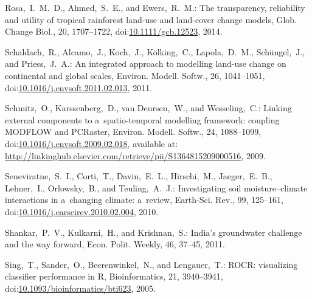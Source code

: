 \documentclass[gmdd, online, hvmath]{copernicus}
\begin{document}
\begin{thebibliography}{97}
    Rosa,~I.~M.~D., Ahmed,~S.~E., and Ewers,~R.~M.: The transparency,
    reliability and utility of tropical rainforest land-use and
    land-cover change models, Glob. Change Biol., 20, 1707--1722,
    doi:\href{http://dx.doi.org/10.1111/gcb.12523}{10.1111/gcb.12523}, 2014.


    Schaldach,~R., Alcamo,~J., Koch,~J., K\"{o}lking,~C.,
    Lapola,~D.~M., Sch\"{u}ngel,~J., and Priess,~J.~A.: An integrated
    approach to modelling land-use change on continental and global
    scales, Environ. Modell. Softw., 26, 1041--1051,
    doi:\href{http://dx.doi.org/10.1016/j.envsoft.2011.02.013}{10.1016/j.envsoft.2011.02.013}, 2011.


   Schmitz,~O., Karssenberg,~D., van
    Deursen,~W., and Wesseling,~C.: Linking external components to
    a~spatio-temporal modelling framework: coupling {MODFLOW} and
    {PCRaster}, Environ. Modell. Softw., 24, 1088--1099,
    doi:\href{http://dx.doi.org/10.1016/j.envsoft.2009.02.018}{10.1016/j.envsoft.2009.02.018}, available at:
    \url{http://linkinghub.elsevier.com/retrieve/pii/S1364815209000516},
    2009.


   Seneviratne,~S.~I., Corti,~T.,
    Davin,~E.~L., Hirschi,~M., Jaeger,~E.~B., Lehner,~I.,
    Orlowsky,~B., and Teuling,~A.~J.: Investigating soil
    moisture{--}climate interactions in a~changing climate: a~review,
    Earth-Sci. Rev., 99, 125--161,
    doi:\href{http://dx.doi.org/10.1016/j.earscirev.2010.02.004}{10.1016/j.earscirev.2010.02.004}, 2010.


   Shankar,~P.~V., Kulkarni,~H., and
    Krishnan,~S.: India's groundwater challenge and the way forward,
    Econ. Polit. Weekly, 46, 37--45, 2011.


   Sing,~T., Sander,~O., Beerenwinkel,~N., and
    Lengauer,~T.: {ROCR:} visualizing classifier performance in R,
    Bioinformatics, 21, 3940--3941,
    doi:\href{http://dx.doi.org/10.1093/bioinformatics/bti623}{10.1093/bioinformatics/bti623}, 2005.



\end{thebibliography}
\end{document}

